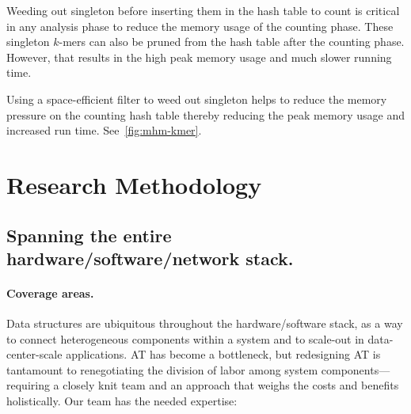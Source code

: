 Weeding out singleton \kmers before inserting them in the hash table to count
is critical in any \kmer analysis phase to reduce the memory usage of the
counting phase. These singleton $k$-mers can also be pruned from the hash table
after the counting phase. However, that results in the high peak memory usage
and much slower running time.

Using a space-efficient filter to weed out singleton \kmers helps to reduce
the memory pressure on the counting hash table thereby reducing the peak memory
usage and increased run time. See~\cref{fig:mhm-kmer}.


\section{Research Methodology}


\subsection{Spanning the entire hardware/software/network stack.}


\paragraph{Coverage areas.} Data structures are ubiquitous throughout the
hardware/software stack, as a way to connect heterogeneous components within a
system and to scale-out in data-center-scale applications.  AT has become a
bottleneck, but redesigning AT is tantamount to renegotiating the division of
labor among system components---requiring a closely knit team and an approach
that weighs the costs and benefits holistically.
Our team has the needed expertise:

